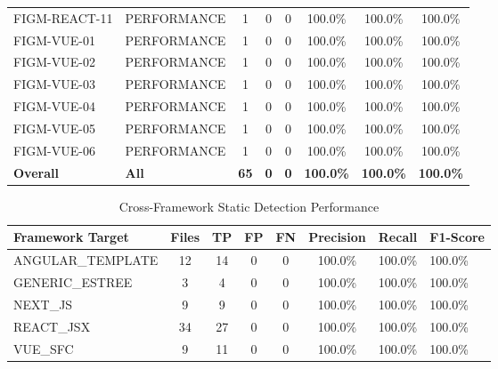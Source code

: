 \begin{table}[htbp]
\begin{tabular}{llcccccc}
FIGM-REACT-11 & PERFORMANCE & 1 & 0 & 0 & 100.0\% & 100.0\% & 100.0\% \\
FIGM-VUE-01 & PERFORMANCE & 1 & 0 & 0 & 100.0\% & 100.0\% & 100.0\% \\
FIGM-VUE-02 & PERFORMANCE & 1 & 0 & 0 & 100.0\% & 100.0\% & 100.0\% \\
FIGM-VUE-03 & PERFORMANCE & 1 & 0 & 0 & 100.0\% & 100.0\% & 100.0\% \\
FIGM-VUE-04 & PERFORMANCE & 1 & 0 & 0 & 100.0\% & 100.0\% & 100.0\% \\
FIGM-VUE-05 & PERFORMANCE & 1 & 0 & 0 & 100.0\% & 100.0\% & 100.0\% \\
FIGM-VUE-06 & PERFORMANCE & 1 & 0 & 0 & 100.0\% & 100.0\% & 100.0\% \\
\midrule
\textbf{Overall} & \textbf{All} & \textbf{65} & \textbf{0} & \textbf{0} & \textbf{100.0\%} & \textbf{100.0\%} & \textbf{100.0\%} \\
\bottomrule
\end{tabular}
\end{table}

\begin{table}[htbp]
\centering
\caption{Cross-Framework Static Detection Performance}
\label{tab:figm_framework_performance}
\begin{tabular}{lcccccc}
\toprule
\textbf{Framework Target} & \textbf{Files} & \textbf{TP} & \textbf{FP} & \textbf{FN} & \textbf{Precision} & \textbf{Recall} & \textbf{F1-Score} \\
\midrule
ANGULAR_TEMPLATE & 12 & 14 & 0 & 0 & 100.0\% & 100.0\% & 100.0\% \\
GENERIC_ESTREE & 3 & 4 & 0 & 0 & 100.0\% & 100.0\% & 100.0\% \\
NEXT_JS & 9 & 9 & 0 & 0 & 100.0\% & 100.0\% & 100.0\% \\
REACT_JSX & 34 & 27 & 0 & 0 & 100.0\% & 100.0\% & 100.0\% \\
VUE_SFC & 9 & 11 & 0 & 0 & 100.0\% & 100.0\% & 100.0\% \\
\bottomrule
\end{tabular}
\end{table}
